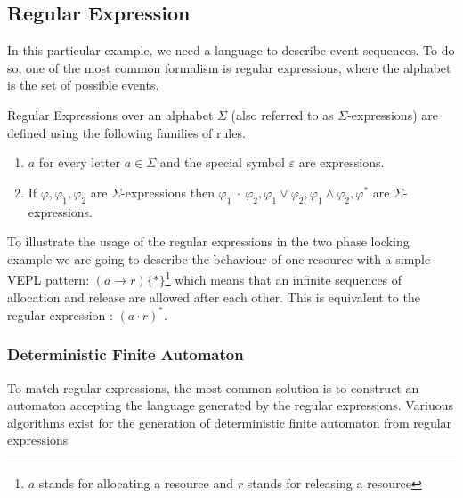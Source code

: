 		\subsection{Regular Expression}
		
			In this particular example, we need a language to describe event sequences. To do so, one of the most common
			formalism is regular expressions, where the alphabet is the set of possible events.

			
			\begin{dfn}
				\label{dfn:cep:re}
				Regular Expressions over an alphabet $\Sigma$ (also referred to as $\Sigma$-expressions)
				are defined using the following families of rules.
				\begin{enumerate}
					\item \underline{$a$} for every letter $a \in \Sigma$ and the special symbol $\varepsilon$ are expressions.
					\item If $\varphi, \varphi_1, \varphi_2$ are $\Sigma$-expressions then %
						$ %
						\varphi_1~\cdot~\varphi_2,
						\varphi_1 \vee \varphi_2,
						\varphi_1 \wedge \varphi_2,
						\varphi^\ast
						$ are $\Sigma$-expressions.
				\end{enumerate}
			\end{dfn}
			
			To illustrate the usage of the regular expressions in the two phase locking example we are going to describe the behaviour of one resource with a simple VEPL pattern:
			$(a \rightarrow r)\{\ast\}$\footnote{$a$ stands for allocating a resource and $r$ stands for releasing a resource } 
			which means that an infinite sequences of allocation and release are allowed after each other. 
			This is equivalent to the regular expression : $(a\cdot r)^\ast$.

			\subsubsection{Deterministic Finite Automaton}
				To match regular expressions, the most common solution is to construct an automaton accepting the language generated by the regular expressions. Variuous algorithms
				exist for the generation of deterministic finite automaton from regular expressions
				
